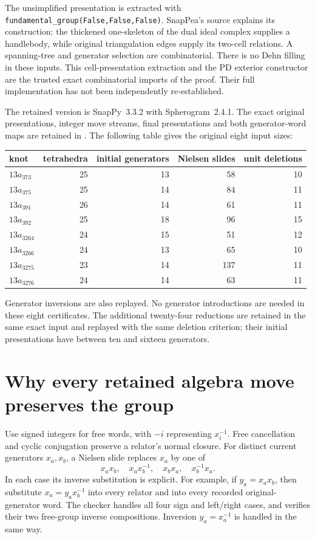 \documentclass[11pt]{article}
\begin{document}
The unsimplified presentation is extracted with
\texttt{fundamental\_group(False,False,False)}.
SnapPea's source explains its construction: the thickened one-skeleton
of the dual ideal complex supplies a handlebody, while original
triangulation edges supply its two-cell relations. A spanning-tree
and generator selection are combinatorial. There is no Dehn filling
in these inputs. This cell-presentation extraction and the PD exterior
constructor are the trusted exact combinatorial imports of the proof.
Their full implementation has not been independently re-established.

The retained version is SnapPy~3.3.2 with Spherogram~2.4.1.
The exact original presentations, integer move streams, final
presentations and both generator-word maps are retained in
. The following table gives the original eight input sizes:
\begin{center}
\begin{tabular}{lrrrr}
\toprule
knot&tetrahedra&initial generators&Nielsen slides&unit deletions\\
\midrule
$13a_{373}$&25&13&58&10\\
$13a_{375}$&25&14&84&11\\
$13a_{391}$&26&14&61&11\\
$13a_{392}$&25&18&96&15\\
$13a_{3264}$&24&15&51&12\\
$13a_{3266}$&24&13&65&10\\
$13a_{3275}$&23&14&137&11\\
$13a_{3276}$&24&14&63&11\\
\bottomrule
\end{tabular}
\end{center}
Generator inversions are also replayed. No generator introductions
are needed in these eight certificates. The additional twenty-four
reductions are retained in the same exact input and replayed with the
same deletion criterion; their initial presentations have between ten
and sixteen generators.

\section{Why every retained algebra move preserves the group}

Use signed integers for free words, with $-i$ representing $x_i^{-1}$.
Free cancellation and cyclic conjugation preserve a relator's normal
closure. For distinct current generators $x_a,x_b$, a Nielsen slide
replaces $x_a$ by one of
\[
 x_ax_b,\quad x_ax_b^{-1},\quad x_bx_a,\quad x_b^{-1}x_a.
\]
In each case its inverse substitution is explicit. For example,
if $y_a=x_ax_b$, then substitute $x_a=y_ax_b^{-1}$ into every
relator and into every recorded original-generator word.
The checker handles all four sign and left/right cases, and verifies
their two free-group inverse compositions. Inversion
$y_a=x_a^{-1}$ is handled in the same way.
\end{document}
